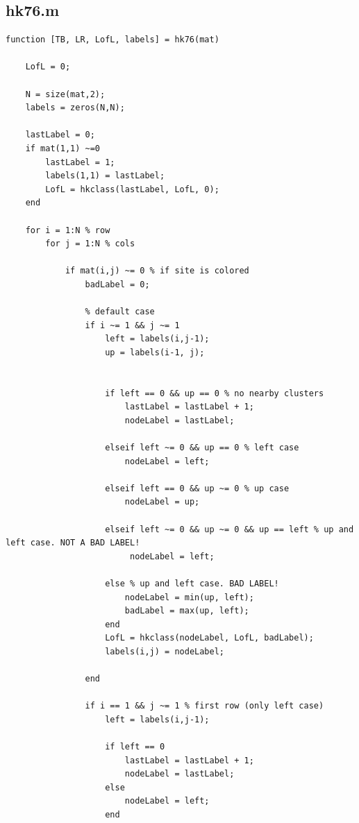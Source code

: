 \subsection*{hk76.m}
\begin{lstlisting}[style=matlabstyle]
function [TB, LR, LofL, labels] = hk76(mat)

    LofL = 0;

    N = size(mat,2);
    labels = zeros(N,N);
   
    lastLabel = 0;
    if mat(1,1) ~=0
        lastLabel = 1;
        labels(1,1) = lastLabel;
        LofL = hkclass(lastLabel, LofL, 0);
    end

    for i = 1:N % row
        for j = 1:N % cols
            
            if mat(i,j) ~= 0 % if site is colored
                badLabel = 0;

                % default case
                if i ~= 1 && j ~= 1 
                    left = labels(i,j-1);
                    up = labels(i-1, j);
                    

                    if left == 0 && up == 0 % no nearby clusters
                        lastLabel = lastLabel + 1;
                        nodeLabel = lastLabel;
                       
                    elseif left ~= 0 && up == 0 % left case
                        nodeLabel = left;

                    elseif left == 0 && up ~= 0 % up case
                        nodeLabel = up;
                        
                    elseif left ~= 0 && up ~= 0 && up == left % up and left case. NOT A BAD LABEL!
                         nodeLabel = left;

                    else % up and left case. BAD LABEL!
                        nodeLabel = min(up, left); 
                        badLabel = max(up, left);
                    end
                    LofL = hkclass(nodeLabel, LofL, badLabel);
                    labels(i,j) = nodeLabel;

                end
    
                if i == 1 && j ~= 1 % first row (only left case)
                    left = labels(i,j-1);
                    
                    if left == 0 
                        lastLabel = lastLabel + 1;
                        nodeLabel = lastLabel;
                    else
                        nodeLabel = left;
                    end


\end{lstlisting}
